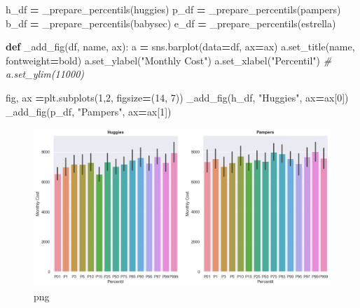 \documentclass[
]{article}
\newenvironment{Shaded}{\begin{snugshade}}{\end{snugshade}}
\newcommand{\CommentTok}[1]{\textcolor[rgb]{0.56,0.35,0.01}{\textit{#1}}}
\newcommand{\DecValTok}[1]{\textcolor[rgb]{0.00,0.00,0.81}{#1}}
\newcommand{\KeywordTok}[1]{\textcolor[rgb]{0.13,0.29,0.53}{\textbf{#1}}}
\newcommand{\NormalTok}[1]{#1}
\newcommand{\OperatorTok}[1]{\textcolor[rgb]{0.81,0.36,0.00}{\textbf{#1}}}
\newcommand{\StringTok}[1]{\textcolor[rgb]{0.31,0.60,0.02}{#1}}
\begin{document}
\begin{Shaded}
\begin{Highlighting}[]
\NormalTok{h\_df }\OperatorTok{=}\NormalTok{ \_prepare\_percentils(}\StringTok{\textquotesingle{}huggies\textquotesingle{}}\NormalTok{)}
\NormalTok{p\_df }\OperatorTok{=}\NormalTok{ \_prepare\_percentils(}\StringTok{\textquotesingle{}pampers\textquotesingle{}}\NormalTok{)}
\NormalTok{b\_df }\OperatorTok{=}\NormalTok{ \_prepare\_percentils(}\StringTok{\textquotesingle{}babysec\textquotesingle{}}\NormalTok{)}
\NormalTok{e\_df }\OperatorTok{=}\NormalTok{ \_prepare\_percentils(}\StringTok{\textquotesingle{}estrella\textquotesingle{}}\NormalTok{)}
\end{Highlighting}
\end{Shaded}

\begin{Shaded}
\begin{Highlighting}[]
\KeywordTok{def}\NormalTok{ \_add\_fig(df, name, ax):}
\NormalTok{    a }\OperatorTok{=}\NormalTok{ sns.barplot(data}\OperatorTok{=}\NormalTok{df, ax}\OperatorTok{=}\NormalTok{ax)}
\NormalTok{    a.set\_title(name, fontweight}\OperatorTok{=}\StringTok{\textquotesingle{}bold\textquotesingle{}}\NormalTok{)}
\NormalTok{    a.set\_ylabel(}\StringTok{"Monthly Cost"}\NormalTok{)}
\NormalTok{    a.set\_xlabel(}\StringTok{"Percentil"}\NormalTok{)}
    \CommentTok{\# a.set\_ylim(11000)}


\NormalTok{fig, ax }\OperatorTok{=}\NormalTok{plt.subplots(}\DecValTok{1}\NormalTok{,}\DecValTok{2}\NormalTok{, figsize}\OperatorTok{=}\NormalTok{(}\DecValTok{14}\NormalTok{, }\DecValTok{7}\NormalTok{))}
\NormalTok{\_add\_fig(h\_df, }\StringTok{"Huggies"}\NormalTok{, ax}\OperatorTok{=}\NormalTok{ax[}\DecValTok{0}\NormalTok{])}
\NormalTok{\_add\_fig(p\_df, }\StringTok{"Pampers"}\NormalTok{, ax}\OperatorTok{=}\NormalTok{ax[}\DecValTok{1}\NormalTok{])}
\end{Highlighting}
\end{Shaded}

\begin{figure}
\centering
\includegraphics{output_38_0.png}
\caption{png}
\end{figure}
\end{document}
